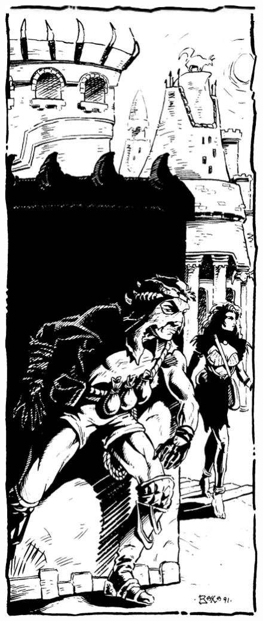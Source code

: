 \begin{figure}[h!]
\centering
\includegraphics[width=\columnwidth]{images/rogue-1.png}
\end{figure}

